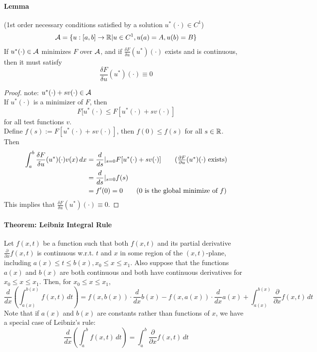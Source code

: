 \documentclass[11pt]{article}
\begin{document}
\paragraph{Lemma}(1st order necessary conditions satisfied by a solution $u^*(\cdot) \in C^1$)
$$\mathcal{A} = \{ u: [a,b] \rightarrow \mathbb{R} | u \in C^1, u(a) = A, u(b) = B\}$$
If $u^*(\cdot) \in \mathcal{A}$ minimizes $F$ over $\mathcal{A}$, and if $\frac{\delta F}{\delta u}(u^*)(\cdot)$ exists and is continuous, then it must satisfy
$$\frac{\delta F}{\delta u}(u^*)(\cdot) \equiv 0$$
\begin{proof}
	note: $u^*(\cdot) + sv(\cdot) \in \mathcal{A}$ \\
	If $u^*(\cdot)$ is a minimizer of $F$, then
	$$F[u^*(\cdot) \leq F[u^*(\cdot) + sv(\cdot)]$$
	for all test functions $v$. \\
	Define $f(s) := F[u^*(\cdot) + sv(\cdot)]$, then $f(0) \leq f(s)$ for all $s \in \mathbb{R}$. \\
	Then 
	\begin{align}
		\int_a^b \frac{\delta F}{\delta u}(u^*)(\cdot)v(x) \, dx
		&= \frac{d}{ds}|_{s=0} F[u^*(\cdot) + sv(\cdot)] \tag{$\frac{\partial F}{\partial u}(u^*)(\cdot)$ exists} \\
		&= \frac{d}{ds}|_{s=0} f(s)\\
		&= f'(0) = 0 \tag{0 is the global minimize of $f$}
	\end{align}
	This implies that $\frac{\delta F}{\delta u}(u^*)(\cdot) \equiv 0$.
\end{proof}

\paragraph{Theorem: Leibniz Integral Rule}
Let $f(x,t)$ be a function such that both $f(x,t)$ and its partial derivative  $\frac{\partial}{\partial x} f(x,t)$ is continuous w.r.t. $t$ and $x$ in some region of the $(x,t)$-plane, including $a(x) \leq t \leq b(x), x_0 \leq x \leq x_1$. Also suppose that the functions $a(x)$ and $b(x)$ are both continuous and both have continuous derivatives for $x_0 \leq x \leq x_1$. Then, for $x_0 \leq x \leq x_1$,
$$\frac{d}{dx}\left(\int_{a(x)}^{b(x)} f(x,t) \, dt\right) = f(x, b(x))\cdot \frac{d}{dx} b(x) - f(x, a(x)) \cdot \frac{d}{dx} a(x) + \int_{a(x)}^{b(x)} \frac{\partial}{\partial x} f(x,t) \, dt$$
Note that if $a(x)$ and $b(x)$ are constants rather than functions of $x$, we have a special case of Leibniz's rule:
$$\frac{d}{dx} \left( \int_a^b f(x,t)\, dt\right) = \int_a^b \frac{\partial}{\partial x} f(x,t)\, dt$$
\end{document}
